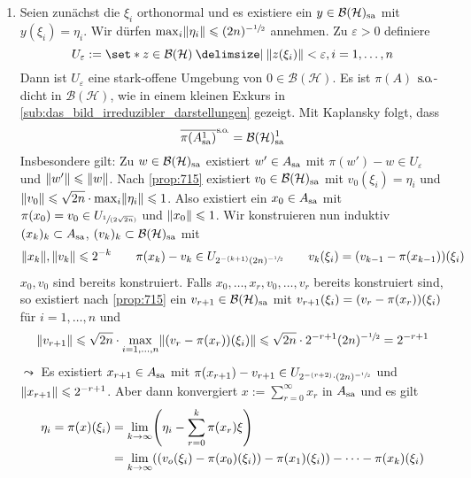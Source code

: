 \begin{beweis}
	\begin{enumerate}[label={Teil \Roman*.},wide,font=\bfseries\scshape]
		\item \label{enum:kad:1} Seien zunächst die $\xi_i$ orthonormal und es existiere ein $y \in \mathcal{B}(\mathcal{H})_\sa$ mit $y(\xi_i)=\eta_i$.
		Wir dürfen $\max_i \norm*{\eta_i} \le (2n)^{- \sfrac{1}{2}}$ annehmen.
		Zu $\varepsilon>0$ definiere
		\[
			U_\varepsilon := \set*{z \in \mathcal{B}(\mathcal{H}) \given \norm*{z(\xi_i)} < \varepsilon , i=1,\ldots ,n}
		\]
		Dann ist $U_\varepsilon$ eine stark-offene Umgebung von $0 \in \mathcal{B}(\mathcal{H})$.
		Es ist $\pi(A)$ $\so$-dicht in $\mathcal{B}(\mathcal{H})$, wie in einem kleinen Exkurs in \cref{sub:das_bild_irreduzibler_darstellungen} gezeigt.
		Mit Kaplansky folgt, dass 
		\[
			\overline{\pi(A_\sa^1)}^\so = \mathcal{B}(\mathcal{H})_\sa^1
		\]
		Insbesondere gilt:
		Zu $w \in \mathcal{B}(\mathcal{H})_\sa$ existiert $w' \in A_\sa$ mit $\pi(w')-w \in U_\varepsilon$ und $\norm*{w'} \le \norm*{w}$.
		Nach \autoref{prop:715} existiert $v_0 \in \mathcal{B}(\mathcal{H})_\sa$ mit $v_0(\xi_i)=\eta_i$ und $\norm*{v_0} \le \sqrt{2n} \cdot \max_i \norm*{\eta_i} \le 1$.
		Also existiert ein $x_0 \in A_\sa$ mit $\pi(x_0)=v_0 \in U_{\sfrac{1}{(2 \sqrt{2n})}}$ und $\norm*{x_0} \le 1$.
		Wir konstruieren nun induktiv $(x_k)_k \subset A_\sa$, $(v_k)_k \subset \mathcal{B}(\mathcal{H})_\sa$ mit 
		\[
			\norm*{x_k}, \norm*{v_k} \le 2^{-k} \qquad \pi(x_k) -v_k \in U_{2^{-(k+1)} (2n)^{- \sfrac{1}{2}}} \qquad v_k(\xi_i) = \enbrace*{v_{k-1} - \pi(x_{k-1})}(\xi_i)
		\]
		$x_0, v_0$ sind bereits konstruiert.
		Falls $x_0, \ldots ,x_r, v_0, \ldots ,v_r$ bereits konstruiert sind, so existiert nach \autoref{prop:715} ein $v_{r+1} \in \mathcal{B}(\mathcal{H})_\sa$ mit 
		$v_{r+1}(\xi_i)= \enbrace*{v_r- \pi(x_r)}(\xi_i)$ für $i=1,\ldots ,n$ und 
		\[
			\norm*{v_{r+1}} \le \sqrt{2n} \cdot \max_{i=1,\ldots ,n} \norm*{\enbrace*{v_r - \pi(x_r)}(\xi_i)} \le \sqrt{2n} \cdot 2^{-{r+1}} (2n)^{- \sfrac{1}{2}} = 2^{-{r+1}}
		\]
		$\leadsto$ Es existiert $x_{r+1} \in A_\sa$ mit $\pi(x_{r+1}) - v_{r+1} \in U_{2^{-(r+2)} \cdot (2n)^{-\sfrac{1}{2}}}$ und $\norm*{x_{r+1}} \le 2^{-{r+1}}$.
		Aber dann konvergiert $x := \sum_{r=0}^{\infty} x_r$ in $A_\sa$ und es gilt
		\begin{align}
			\eta_i = \pi(x)(\xi_i) 
			&= \lim_{k \to \infty} \enbrace*{\eta_i - \sum_{r=0}^{k} \pi(x_r) \xi}\\ 
			&= \lim_{k \to \infty} \enbrace*{ \enbrace*{v_o(\xi_i) - \pi(x_0)(\xi_i)} - \pi(x_1)(\xi_i)} - \cdots - \pi(x_k)(\xi_i) \\

\end{align}
\end{enumerate}
\end{beweis}
